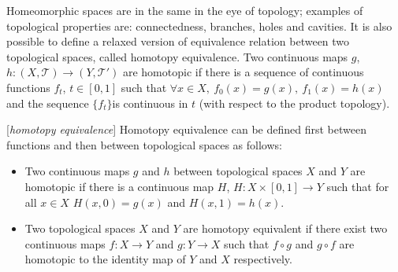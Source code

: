 Homeomorphic spaces are in the same in the eye of topology; examples of topological properties are: connectedness, branches, holes and cavities. It is also possible to define a relaxed version of equivalence relation between two topological spaces, called homotopy equivalence. Two continuous maps $g$, $h \colon (X, \mathcal{T}) \rightarrow (Y,\mathcal{T}')$ are homotopic if there is a sequence of continuous functions $f_t$, $t\in [0,1]$  such that $\forall x \in X, \ f_0(x)=g(x),\ f_1(x)=h(x)$ and the sequence $\{f_t\}$is continuous in $t$ (with respect to the product topology).  

\begin{definition}{[\textit{homotopy equivalence}]}
	Homotopy equivalence can be defined first between functions and then between topological spaces as follows:
	\begin{itemize}
		\item
		Two continuous maps $g$ and $h$ between topological spaces $X$ and $Y$ are homotopic if there is a continuous map $H$, $H\colon X\times [0,1]\rightarrow Y$ such that for all $x\in X$ $H(x,0)=g(x)$ and $H(x,1)=h(x)$. 
		\item
		Two topological spaces $X$ and $Y$ are homotopy equivalent if there exist two continuous maps $f\colon X\rightarrow Y$ and $g\colon Y\rightarrow X$ such that $f\circ g$ and $g\circ f$ are homotopic to the identity map of $Y$ and $X$ respectively. 
	\end{itemize}
	
\end{definition}


